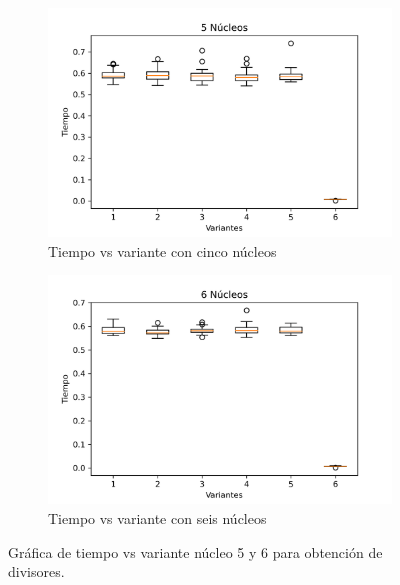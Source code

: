\documentclass{article}
\begin{document}
\begin{figure}[H]
\centering
\begin{subfigure}[b]{0.45\linewidth}
\includegraphics[width=\linewidth]{Gráfica_5.png}
\caption{Tiempo vs variante con cinco núcleos}
\end{subfigure}
\begin{subfigure}[b]{0.45\linewidth}
\includegraphics[width=\linewidth]{Gráfica_6.png}
\caption{Tiempo vs variante con seis núcleos}
\end{subfigure}
\caption{Gráfica de tiempo vs variante núcleo 5 y 6 para obtención de divisores.}
\label{fig:westminster}
\end{figure}
\end{document}
